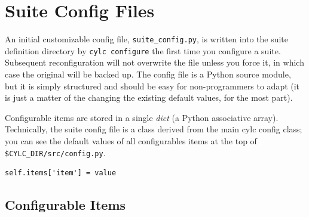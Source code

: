 \documentclass[11pt,a4paper]{article}
\begin{document}
%



\pagebreak
\section{Suite Config Files}
\label{SuiteConfigFiles}

An initial customizable config file, \lstinline=suite_config.py=, is
written into the suite definition directory by 
\lstinline=cylc configure= the first time you configure a suite.
Subsequent reconfiguration will not overwrite the file unless you force
it, in which case the original will be backed up. The config file is a
Python source module, but it is simply structured and should be easy for
non-programmers to adapt (it is just a matter of the changing the
existing default values, for the most part). 

Configurable items are stored in a single {\em dict} (a Python
associative array). Technically, the suite config file is a class
derived from the main cylc config class; you can see the default
values of all configurables items at the top of
\lstinline=$CYLC_DIR/src/config.py=.

\lstset{language=Python}
\begin{lstlisting}
self.items['item'] = value
\end{lstlisting}

\subsection{Configurable Items}
\label{ConfigurableItems}
\end{document}
